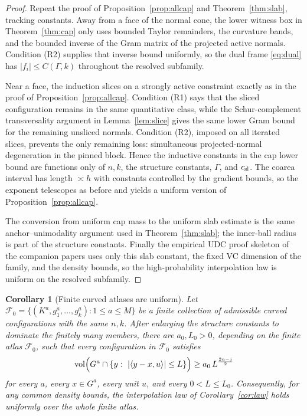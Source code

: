 \documentclass[11pt]{article}
\newtheorem{corollary}[theorem]{Corollary}
\newcommand{\vol}{\operatorname{vol}}
\begin{document}
\begin{proof}
Repeat the proof of Proposition~\ref{prop:allcap} and
Theorem~\ref{thm:slab}, tracking constants.  Away from a face of the normal
cone, the lower witness box in Theorem~\ref{thm:cap} only uses bounded
Taylor remainders, the curvature bands, and the bounded inverse of the Gram
matrix of the projected active normals.  Condition (R2) supplies that inverse
bound uniformly, so the dual frame \eqref{eq:dual} has
\(|f_i|\le C(\Gamma,k)\) throughout the resolved subfamily.

Near a face, the induction slices on a strongly active constraint exactly as in
the proof of Proposition~\ref{prop:allcap}.  Condition (R1) says that the sliced
configuration remains in the same quantitative class, while the Schur-complement
transversality argument in Lemma~\ref{lem:slice} gives the same lower Gram bound
for the remaining unsliced normals.  Condition (R2), imposed on all iterated
slices, prevents the only remaining loss: simultaneous projected-normal
degeneration in the pinned block.  Hence the inductive constants in the cap
lower bound are functions only of \(n,k\), the structure constants,
\(\Gamma\), and \(c_{\rm sl}\).  The coarea interval has length \(\asymp h\)
with constants controlled by the gradient bounds, so the exponent telescopes as
before and yields a uniform version of Proposition~\ref{prop:allcap}.

The conversion from uniform cap mass to the uniform slab estimate is the same
anchor--unimodality argument used in Theorem~\ref{thm:slab}; the inner-ball
radius is part of the structure constants.  Finally the empirical UDC proof
skeleton of the companion papers uses only this slab constant, the fixed VC
dimension of the family, and the density bounds, so the high-probability
interpolation law is uniform on the resolved subfamily.
\end{proof}

\begin{corollary}[Finite curved atlases are uniform]
\label{cor:finite-atlas}
Let \(\mathcal F_0=\{(K^a,g^a_1,\ldots,g^a_k):1\le a\le M\}\) be a finite
collection of admissible curved configurations with the same \(n,k\).  After
enlarging the structure constants to dominate the finitely many members, there
are \(a_0,L_0>0\), depending on the finite atlas \(\mathcal F_0\), such that
every configuration in \(\mathcal F_0\) satisfies
\[
\vol\Bigl(G^a\cap\{y:\ |\langle y-x,u\rangle|\le L\}\Bigr)
\ge a_0\,L^{\frac{2n-j}2}
\]
for every \(a\), every \(x\in G^a\), every unit \(u\), and every
\(0<L\le L_0\).  Consequently, for any common density bounds, the interpolation
law of Corollary~\ref{cor:law} holds uniformly over the whole finite atlas.
\end{corollary}
\end{document}
